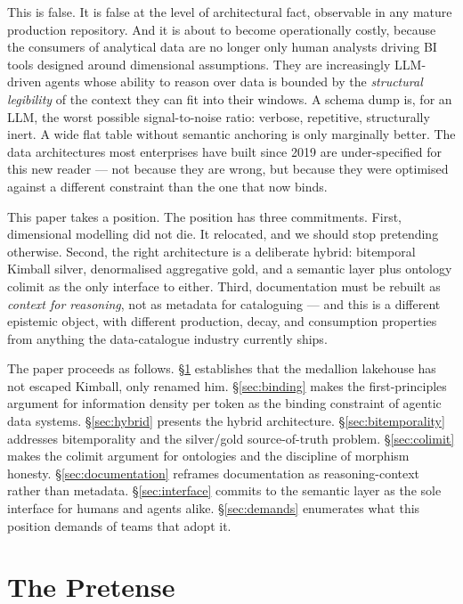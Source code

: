 \documentclass[11pt,a4paper]{article}
\begin{document}
This is false. It is false at the level of architectural fact, observable in any mature production repository. And it is about to become operationally costly, because the consumers of analytical data are no longer only human analysts driving BI tools designed around dimensional assumptions. They are increasingly LLM-driven agents whose ability to reason over data is bounded by the \emph{structural legibility} of the context they can fit into their windows. A schema dump is, for an LLM, the worst possible signal-to-noise ratio: verbose, repetitive, structurally inert. A wide flat table without semantic anchoring is only marginally better. The data architectures most enterprises have built since 2019 are under-specified for this new reader --- not because they are wrong, but because they were optimised against a different constraint than the one that now binds.

This paper takes a position. The position has three commitments. First, dimensional modelling did not die. It relocated, and we should stop pretending otherwise. Second, the right architecture is a deliberate hybrid: bitemporal Kimball silver, denormalised aggregative gold, and a semantic layer plus ontology colimit as the only interface to either. Third, documentation must be rebuilt as \emph{context for reasoning}, not as metadata for cataloguing --- and this is a different epistemic object, with different production, decay, and consumption properties from anything the data-catalogue industry currently ships.

The paper proceeds as follows. \S\ref{sec:pretense} establishes that the medallion lakehouse has not escaped Kimball, only renamed him. \S\ref{sec:binding} makes the first-principles argument for information density per token as the binding constraint of agentic data systems. \S\ref{sec:hybrid} presents the hybrid architecture. \S\ref{sec:bitemporality} addresses bitemporality and the silver/gold source-of-truth problem. \S\ref{sec:colimit} makes the colimit argument for ontologies and the discipline of morphism honesty. \S\ref{sec:documentation} reframes documentation as reasoning-context rather than metadata. \S\ref{sec:interface} commits to the semantic layer as the sole interface for humans and agents alike. \S\ref{sec:demands} enumerates what this position demands of teams that adopt it.

\section{The Pretense}
\label{sec:pretense}
\end{document}
